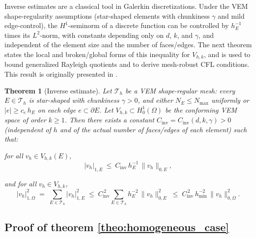 \documentclass{article}
\newtheorem{theo}{Theorem}[section]
\begin{document}
Inverse estimates are a classical tool in Galerkin discretizations. Under the VEM shape-regularity assumptions (star-shaped elements with chunkiness $\gamma$ and mild edge-control), the $H^1$-seminorm of a discrete function can be controlled by $h_E^{-1}$ times its $L^2$-norm, with constants depending only on $d$, $k$, and $\gamma$, and independent of the element size and the number of faces/edges. The next theorem states the local and broken/global forms of this inequality for $V_{h,k}$, and is used to bound generalized Rayleigh quotients and to derive mesh-robust CFL conditions. This result is originally presented in \cite{beirao2013vem}.
\begin{theo}[Inverse estimate]\label{theo:inverse_ineq}
    Let $\mathcal{T}_h$ be a VEM shape-regular mesh: every $E\in\mathcal{T}_h$ is star-shaped with chunkiness $\gamma>0$, and either $N_E\le N_{\max}$ uniformly or $|e|\ge c_e\,h_E$ on each edge $e\subset\partial E$. Let $V_{h,k}\subset H^1_0(\Omega)$ be the conforming VEM space of order $k\ge1$. Then there exists a constant $C_{\mathrm{inv}}=C_{\mathrm{inv}}(d,k,\gamma)>0$ (independent of $h$ and of the actual number of faces/edges of each element) such that:
    
    for all $v_h\in V_{h,k}(E)$,
    \[
      |v_h|_{1,E}\ \le\ C_{\mathrm{inv}}\, h_E^{-1}\, \|v_h\|_{0,E},
    \]
    
    and for all $v_h\in V_{h,k}$,
    \[
      |v_h|_{1,\Omega}^2 \;=\; \sum_{E\in\mathcal{T}_h} |v_h|_{1,E}^2
      \;\le\; C_{\mathrm{inv}}^{\,2} \sum_{E\in\mathcal{T}_h} h_E^{-2}\,\|v_h\|_{0,E}^2
      \;\le\; C_{\mathrm{inv}}^{\,2}\, h_{\min}^{-2}\, \|v_h\|_{0,\Omega}^2.
    \]
\end{theo}

\subsection{Proof of theorem \ref{theo:homogeneous_case}}
\label{sec:proof_homogeneous}
\end{document}
